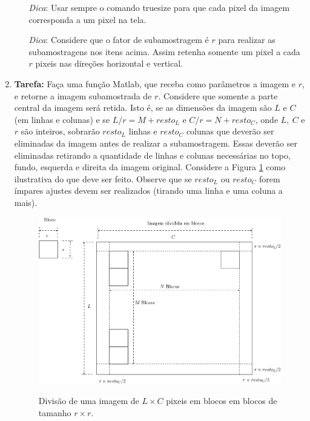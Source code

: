 \documentclass[11pt]{article}
\begin{document}
\begin{enumerate}
\begin{itemize}
\item[\textit{Dica}:] Usar sempre o comando \textsf{truesize} para que cada pixel da imagem corresponda a um pixel na tela.

\item[\textit{Dica}:] Considere que o fator de subamostragem é $r$ para realizar as subamostragens nos itens acima. Assim retenha somente um pixel a cada $r$ pixeis nas direções horizontal e vertical.
\end{itemize}

\item \textbf{Tarefa:} \label{sub_cor_func} Faça uma função Matlab, que receba como parâmetros a imagem e $r$, e retorne a imagem subamostrada de $r$. Considere que somente a parte central da imagem será retida. Isto é, se as dimensões da imagem são $L$ e $C$ (em linhas e colunas) e se $L/r = M + resto_L$ e $C/r = N+ resto_C$, onde $L,~C$ e $r$ são inteiros, sobrarão $resto_L$ linhas e $resto_C$ colunas que deverão ser eliminadas da imagem antes de realizar a subamostragem. Essas deverão ser eliminadas retirando a quantidade de linhas e colunas necessárias no topo, fundo, esquerda e direita da imagem original. Considere a Figura \ref{fig:blocos} como ilustrativa do que deve ser feito. Observe que se $resto_L$ ou $resto_C$ forem ímpares ajustes devem ser realizados (tirando uma linha e uma coluna a mais).

\begin{figure}[h!]
\begin{center}
{\includegraphics[width=12cm]{./blocks_div.eps}}
\caption{Divisão de uma imagem de $L\times C$ pixeis em blocos em blocos de tamanho $r\times r$.}\label{fig:blocos}
\end{center}
\end{figure}


\end{enumerate}
\end{document}
